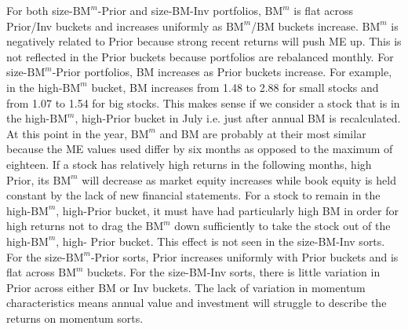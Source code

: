 
For both size-$\text{BM}^m$-Prior and size-BM-Inv portfolios, $\text{BM}^m$ is
flat across Prior/Inv buckets and increases uniformly as $\text{BM}^m$/BM
buckets increase. $\text{BM}^m$ is negatively related to Prior because strong
recent returns will push ME up. This is not reflected in the Prior buckets
because portfolios are rebalanced monthly.
For size-$\text{BM}^m$-Prior portfolios, BM
increases as Prior buckets increase. For example, in the high-$\text{BM}^m$
bucket, BM increases from 1.48 to 2.88 for small stocks and from 1.07 to 1.54
for big stocks. This makes sense if we consider a stock that is in the
high-$\text{BM}^m$, high-Prior bucket in July i.e. just after annual BM is
recalculated. At this point in the year, $\text{BM}^m$ and BM are probably at
their most similar because the ME values
used differ by six months as opposed to the
maximum of eighteen. If a stock has relatively high returns in the following
months, high Prior, its $\text{BM}^m$ will decrease as market equity increases
while book equity is held constant by the lack of new financial statements. For
a stock to remain in the high-$\text{BM}^m$, high-Prior bucket, it must have
had particularly high BM in order for high returns not to drag the
$\text{BM}^m$ down sufficiently to take the stock out of the
high-$\text{BM}^m$, high- Prior bucket. This effect is not seen in the
size-BM-Inv sorts.
For the size-$\text{BM}^m$-Prior sorts, Prior increases uniformly
with Prior buckets and is flat across $\text{BM}^m$ buckets.
For the size-BM-Inv sorts, there is little variation in Prior across either
BM or Inv buckets.
The lack of variation in momentum characteristics means annual value and
investment will struggle to describe the returns on momentum
sorts.

